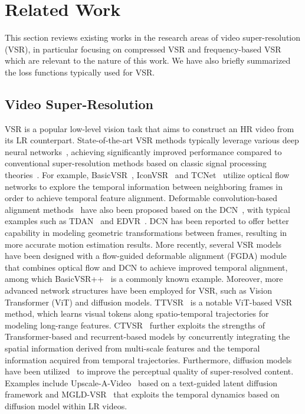 \section{Related Work}
\label{RW}

This section reviews existing works in the research areas of video super-resolution (VSR), in particular focusing on compressed VSR and frequency-based VSR which are relevant to the nature of this work. We have also briefly summarized the loss functions typically used for VSR. 

\subsection{Video Super-Resolution}

VSR is a popular low-level vision task that aims to construct an HR video from its LR counterpart. State-of-the-art VSR methods \cite{chan2021basicvsr,liu2022temporal,xiao2023online,zhu2022fffn,tian2020tdan,baniya2023omnidirectional,wang2019edvr,chan2022basicvsr++,liu2022learning} typically leverage various deep neural networks~\cite{ranjan2017optical,teed2020raft,dai2017deformable,zhu2019deformable,arnab2021vivit,ho2022video,tian2020tdan}, achieving significantly improved performance compared to conventional super-resolution methods based on classic signal processing theories~\cite{liu2013bayesian,xiong2010robust}. For example, 
BasicVSR~\cite{chan2021basicvsr}, IconVSR~\cite{chan2021basicvsr} and TCNet~\cite{liu2022temporal} utilize optical flow~\cite{ranjan2017optical,teed2020raft} networks to explore the temporal information between neighboring frames in order to achieve temporal feature alignment. Deformable convolution-based alignment methods~\cite{tian2020tdan, wang2019edvr} have also been proposed based on the DCN~\cite{dai2017deformable, zhu2019deformable}, with typical examples such as TDAN~\cite{tian2020tdan} and EDVR~\cite{wang2019edvr}. DCN has been reported to offer better capability in modeling geometric transformations between frames, resulting in more accurate motion estimation results. More recently, several VSR models~\cite{chan2022basicvsr++, zhu2024dvsrnet,qing2023video} have been designed with a flow-guided deformable alignment (FGDA) module that combines optical flow and DCN to achieve improved temporal alignment, among which BasicVSR++~\cite{chan2022basicvsr++} is a commonly known example. Moreover, more advanced network structures have been employed for VSR, such as Vision Transformer (ViT) and diffusion models. TTVSR~\cite{liu2022learning} is a notable ViT-based VSR method, which learns visual tokens along spatio-temporal trajectories for modeling long-range features. CTVSR~\cite{tang2023ctvsr} further exploits the strengths of Transformer-based and recurrent-based models by concurrently integrating the spatial information derived from multi-scale features and the temporal information acquired from temporal trajectories. Furthermore, diffusion models~\cite{hu2023lamd,ho2022video} have been utilized~\cite{zhou2024upscale,chen2024learning,yang2025motion} to improve the perceptual quality of super-resolved content. Examples include Upscale-A-Video~\cite{zhou2024upscale} based on a text-guided latent diffusion framework and MGLD-VSR~\cite{yang2025motion} that exploits the temporal dynamics based on diffusion model within LR videos. 
